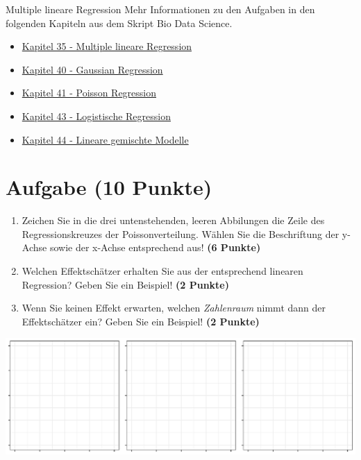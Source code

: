 \documentclass[a4paper, 10pt]{scrartcl}\usepackage[]{graphicx}\usepackage[]{xcolor}
\makeatletter
\def\maxwidth{ %
  \ifdim\Gin@nat@width>\linewidth
    \linewidth
  \else
    \Gin@nat@width
  \fi
}
\makeatother
\begin{document}
\clearpage
\begin{graybox}{Multiple lineare Regression}
Mehr Informationen zu den Aufgaben in den folgenden Kapiteln aus dem Skript Bio Data Science.
  \begin{itemize}
  \item \href{https://jkruppa.github.io/stat-modeling-basic.html}{Kapitel 35 - Multiple lineare Regression}
  \item \href{https://jkruppa.github.io/stat-modeling-gaussian.html}{Kapitel 40 - Gaussian Regression}
  \item \href{https://jkruppa.github.io/stat-modeling-poisson.html}{Kapitel 41 - Poisson Regression}
  \item \href{https://jkruppa.github.io/stat-modeling-logistic.html}{Kapitel 43 - Logistische Regression}
  \item \href{https://jkruppa.github.io/stat-modeling-mixed.html}{Kapitel 44 - Lineare gemischte Modelle}
  \end{itemize}
\end{graybox}

\section{Aufgabe \hfill (10 Punkte)}



\begin{enumerate}
\item Zeichen Sie in die drei untenstehenden, leeren Abbilungen die Zeile des
  Regressionskreuzes der Poissonverteilung. W{\"a}hlen Sie die Beschriftung der
  y-Achse sowie der x-Achse entsprechend aus! \textbf{(6 Punkte)}
\item Welchen Effektsch{\"a}tzer erhalten Sie aus der entsprechend linearen
  Regression? Geben Sie ein Beispiel! \textbf{(2 Punkte)}
\item Wenn Sie keinen Effekt erwarten, welchen \textit{Zahlenraum} nimmt dann
  der Effektsch{\"a}tzer ein? Geben Sie ein Beispiel! \textbf{(2 Punkte)}
\end{enumerate}



{\centering \includegraphics[width=\maxwidth]{img/regression-01-1} 

}
\end{document}
